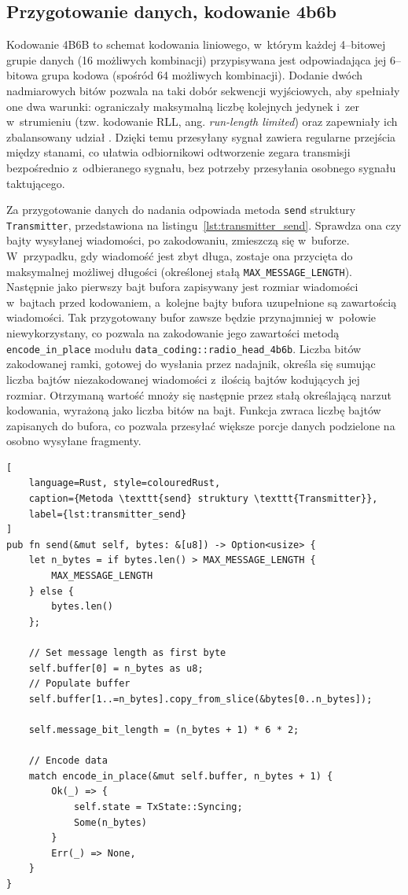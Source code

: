 \subsection{Przygotowanie danych, kodowanie 4b6b}
Kodowanie 4B6B  to schemat kodowania liniowego, 
w~którym  każdej 4--bitowej grupie danych (16 możliwych kombinacji) przypisywana 
jest odpowiadająca jej 6--bitowa grupa kodowa (spośród 64 możliwych kombinacji). 
Dodanie dwóch nadmiarowych bitów pozwala na taki dobór sekwencji wyjściowych, 
aby spełniały one dwa warunki: ograniczały maksymalną liczbę kolejnych jedynek 
i~zer w~strumieniu (tzw. kodowanie RLL, ang. \textit{run-length limited}) oraz 
zapewniały ich zbalansowany udział . 
Dzięki temu przesyłany sygnał zawiera regularne przejścia między stanami,
co ułatwia odbiornikowi odtworzenie zegara transmisji 
bezpośrednio z~odbieranego sygnału, bez potrzeby przesyłania osobnego sygnału 
taktującego.

Za przygotowanie danych do nadania odpowiada metoda \texttt{send} struktury
\texttt{Transmitter}, przedstawiona na listingu~\ref{lst:transmitter_send}. 
Sprawdza ona czy bajty wysyłanej wiadomości, po zakodowaniu, zmieszczą się 
w~buforze. W~przypadku, gdy wiadomość jest zbyt długa, zostaje ona przycięta
do maksymalnej możliwej długości (określonej stałą \texttt{MAX\_MESSAGE\_LENGTH}).
Następnie jako pierwszy bajt bufora zapisywany jest rozmiar wiadomości w~bajtach
przed kodowaniem, a~kolejne bajty bufora uzupełnione są zawartością wiadomości.
Tak przygotowany bufor zawsze będzie przynajmniej w~połowie niewykorzystany,
co pozwala na zakodowanie jego zawartości metodą \texttt{encode\_in\_place} modułu
\texttt{data\_coding::radio\_head\_4b6b}.
Liczba bitów zakodowanej ramki, gotowej do wysłania przez nadajnik,
określa się sumując liczba bajtów niezakodowanej wiadomości z~ilością
bajtów kodujących jej rozmiar. Otrzymaną wartość mnoży się następnie przez stałą 
określającą narzut kodowania, wyrażoną jako liczba bitów na bajt.
Funkcja zwraca liczbę bajtów zapisanych do bufora, co pozwala przesyłać większe 
porcje danych podzielone na osobno wysyłane fragmenty.

\begin{lstlisting}[
    language=Rust, style=colouredRust, 
    caption={Metoda \texttt{send} struktury \texttt{Transmitter}},
    label={lst:transmitter_send}
]
pub fn send(&mut self, bytes: &[u8]) -> Option<usize> {
    let n_bytes = if bytes.len() > MAX_MESSAGE_LENGTH {
        MAX_MESSAGE_LENGTH
    } else {
        bytes.len()
    };

    // Set message length as first byte
    self.buffer[0] = n_bytes as u8;
    // Populate buffer
    self.buffer[1..=n_bytes].copy_from_slice(&bytes[0..n_bytes]);

    self.message_bit_length = (n_bytes + 1) * 6 * 2;

    // Encode data
    match encode_in_place(&mut self.buffer, n_bytes + 1) {
        Ok(_) => {
            self.state = TxState::Syncing;
            Some(n_bytes)
        }
        Err(_) => None,
    }
}
\end{lstlisting}


